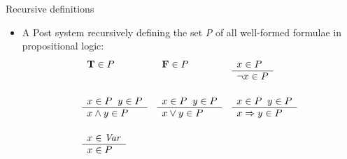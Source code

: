 \documentclass[style=sailor,size=12pt]{powerdot}
\newcommand{\id}[1]{\mbox{\it #1\/}}
\newcommand{\bid}[1]{\mbox{\bf #1}}
\begin{document}
\begin{wideslide}[bm=,toc=]{Recursive definitions}
\begin{itemize}
\item A Post system recursively defining the set {\em P\/} of all well-formed formulae in propositional logic:
\begin{displaymath}
\begin{array}{lll}
        \begin{array}[t]{l}
        \bid{T}\in P
        \end{array}
&
        \begin{array}[t]{l}
        \bid{F}\in P
        \end{array}
&
	\begin{array}[t]{l}
        x \in P \\
        \hline
        \neg x \in P
        \end{array} \\[6ex]

	\begin{array}[t]{l}
	x \in P \;\;y \in P \\
	\hline
	x \wedge y \in P
	\end{array}
&
	\begin{array}[t]{l}
	x \in P \;\;y \in P \\
	\hline
	x \vee y \in P
	\end{array}
&
	\begin{array}[t]{l}
	x \in P \;\;y \in P \\
	\hline
	x \Rightarrow y \in P
	\end{array} \\[6ex]

	\begin{array}[t]{l}
        x \in \id{Var} \\
        \hline
        x \in P
        \end{array}
\end{array}
\end{displaymath}
\end{itemize}
\end{wideslide}
\end{document}
